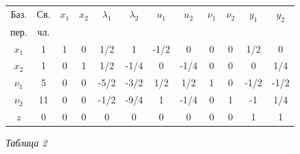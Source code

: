 {\begin{flushleft}
\begin{tabular}{|c|c|c|c|c|c|c|c|c|c|c|c|}
\hline
Баз.&Св.&$x_1$&$ x_2$&$\lambda_1$&$\lambda_2$&$u_1$&$u_2$&$\mspace{1mu}\nu_1$&$\mspace{1mu}\nu_2$&$y_1$&$y_2$\\
пер.&чл.& & & & & & & & & & \\
\hline
$x_1$&{\footnotesize1}&{\footnotesize1}&{\footnotesize0}&{\footnotesize1/2}&{\footnotesize1}&{\footnotesize-1/2}&{\footnotesize0}&{\footnotesize0}&{\footnotesize0}&{\footnotesize1/2}&{\footnotesize0}\\  [0.15cm]
\hline
$x_2$&{\footnotesize1}&{\footnotesize0}&{\footnotesize1}&{\footnotesize1/2}&{\footnotesize-1/4}&{\footnotesize0}&{\footnotesize-1/4}&{\footnotesize0}&{\footnotesize0}&{\footnotesize0}&{\footnotesize1/4}\\ [0.15cm]
\hline
$\nu_1$&{\footnotesize5}&{\footnotesize0}&{\footnotesize0}&{\footnotesize-5/2}&{\footnotesize-3/2}&{\footnotesize1/2}&{\footnotesize1/2}&{\footnotesize1}&{\footnotesize0}&{\footnotesize-1/2}&{\footnotesize-1/2}\\ [0.15cm]
\hline
$\nu_2$&{\footnotesize11}&{\footnotesize0}&{\footnotesize0}&{\footnotesize-1/2}&{\footnotesize-9/4}&{\footnotesize1}&-{\footnotesize1/4}&{\footnotesize0}&{\footnotesize1}&{\footnotesize-1}&{\footnotesize1/4}\\[0.19cm]
\hline
$z$&{\footnotesize0}&{\footnotesize0}&{\footnotesize0}&{\footnotesize0}&{\footnotesize0}&{\footnotesize0}&{\footnotesize0}&{\footnotesize0}&{\footnotesize0}&{\footnotesize1}&{\footnotesize1}\\[0.19cm]
\hline
\end{tabular}
\end{flushleft}

\begin{flushright}\textit{Таблица 2}\end{flushright}

}
